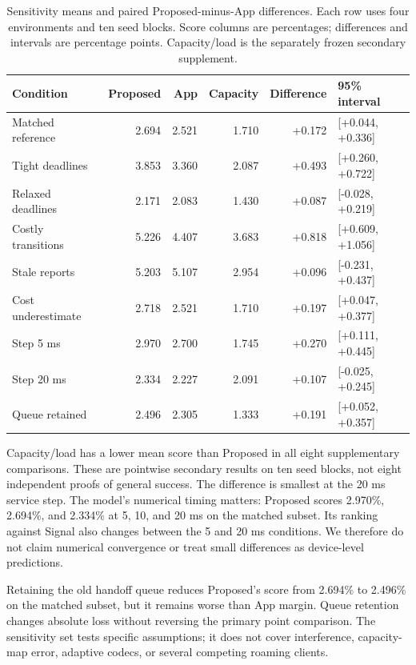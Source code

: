 \documentclass[11pt,a4paper]{article}
\begin{document}
\begin{table}[htbp]\centering\small
\caption{Sensitivity means and paired Proposed-minus-App differences. Each row uses four environments and ten seed blocks. Score columns are percentages; differences and intervals are percentage points. Capacity/load is the separately frozen secondary supplement.}\label{tab:sensitivity}
\begin{tabular}{@{}lrrrrl@{}}\toprule
Condition & Proposed & App & Capacity & Difference & 95\% interval\\\midrule
Matched reference & 2.694 & 2.521 & 1.710 & +0.172 & [+0.044, +0.336] \\
Tight deadlines & 3.853 & 3.360 & 2.087 & +0.493 & [+0.260, +0.722] \\
Relaxed deadlines & 2.171 & 2.083 & 1.430 & +0.087 & [-0.028, +0.219] \\
Costly transitions & 5.226 & 4.407 & 3.683 & +0.818 & [+0.609, +1.056] \\
Stale reports & 5.203 & 5.107 & 2.954 & +0.096 & [-0.231, +0.437] \\
Cost underestimate & 2.718 & 2.521 & 1.710 & +0.197 & [+0.047, +0.377] \\
Step 5 ms & 2.970 & 2.700 & 1.745 & +0.270 & [+0.111, +0.445] \\
Step 20 ms & 2.334 & 2.227 & 2.091 & +0.107 & [-0.025, +0.245] \\
Queue retained & 2.496 & 2.305 & 1.333 & +0.191 & [+0.052, +0.357] \\
\bottomrule\end{tabular}\end{table}

Capacity/load has a lower mean score than Proposed in all eight supplementary comparisons. These are pointwise secondary results on ten seed blocks, not eight independent proofs of general success. The difference is smallest at the 20 ms service step. The model's numerical timing matters: Proposed scores 2.970\%, 2.694\%, and 2.334\% at 5, 10, and 20 ms on the matched subset. Its ranking against Signal also changes between the 5 and 20 ms conditions. We therefore do not claim numerical convergence or treat small differences as device-level predictions.

Retaining the old handoff queue reduces Proposed's score from 2.694\% to 2.496\% on the matched subset, but it remains worse than App margin. Queue retention changes absolute loss without reversing the primary point comparison. The sensitivity set tests specific assumptions; it does not cover interference, capacity-map error, adaptive codecs, or several competing roaming clients.
\end{document}
